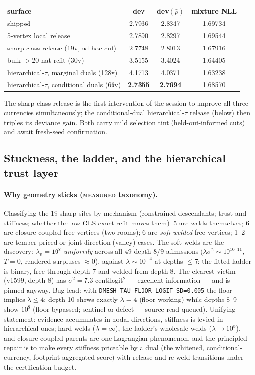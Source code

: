 \begin{center}
\begin{tabular}{lccc}
\hline
surface & dev & dev$(\bar p)$ & mixture NLL\\
\hline
shipped & 2.7936 & 2.8347 & 1.69734\\
5-vertex local release & 2.7890 & 2.8297 & 1.69544\\
sharp-class release (19v, ad-hoc cut) & 2.7748 & 2.8013 & 1.67916\\
bulk $>$20-nat refit (30v) & 3.5155 & 3.4024 & 1.64405\\
hierarchical-$\tau$, marginal duals (128v) & 4.1713 & 4.0371 & 1.63238\\
hierarchical-$\tau$, conditional duals (66v) & \textbf{2.7355} & \textbf{2.7694} & 1.68570\\
\hline
\end{tabular}
\end{center}

The sharp-class release is the first intervention of the session to improve
all three currencies simultaneously; the conditional-dual hierarchical-$\tau$
release (below) then triples its deviance gain. Both carry mild selection
tint (held-out-informed cuts) and await fresh-seed confirmation.

\subsection{Stuckness, the ladder, and the hierarchical trust layer}
\label{sec:aug6-ladder}

\paragraph{Why geometry sticks (\textsc{measured} taxonomy).} Classifying the
19 sharp sites by mechanism (constrained descendants; trust and stiffness;
whether the law-GLS exact refit moves them): 5 are welds themselves; 6 are
closure-coupled free vertices (two rooms); 6 are \emph{soft-welded} free
vertices; 1--2 are temper-priced or joint-direction (valley) cases. The soft
welds are the discovery: $\lambda_v=10^8$ \emph{uniformly} across all 49
depth-8/9 admissions ($\lambda\sigma^2\sim10^{10\text{--}11}$, $T=0$,
rendered surpluses $\approx0$), against $\lambda\sim10^{-4}$ at depths
$\le7$: the fitted ladder is binary, free through depth 7 and welded from
depth 8. The clearest victim (v1599, depth 8) has $\sigma^2=7.3$
centilogit$^2$ --- excellent information --- and is pinned anyway. Bug lead:
with \texttt{DMESH\_TAU\_FLOOR\_LOGIT\_SD=0.005} the floor implies
$\lambda\le4$; depth 10 shows exactly $\lambda=4$ (floor working) while
depths 8--9 show $10^8$ (floor bypassed; sentinel or defect --- source read
queued). Unifying statement: evidence accumulates in nodal directions,
stiffness is levied in hierarchical ones; hard welds ($\lambda=\infty$), the
ladder's wholesale welds ($\lambda\to10^8$), and closure-coupled parents are
one Lagrangian phenomenon, and the principled repair is to make every
stiffness priceable by a dual (the whitened, conditional-currency,
footprint-aggregated score) with release and re-weld transitions under the
certification budget.

